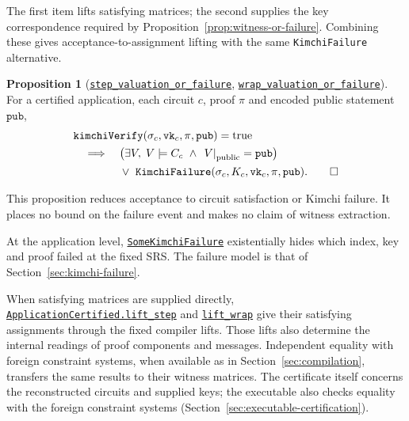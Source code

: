 \documentclass[11pt,a4paper]{article}
\newcommand{\inlinecode}[1]{\mbox{\texttt{#1}}}
\newcommand{\restrict}[2]{\left.#1\right\rvert_{#2}}
\theoremstyle{definition}
\theoremstyle{insetstatement}
\newtheorem{propositiontext}[example]{Proposition}
\newenvironment{statementblock}
  {\begin{list}{}{%
    \setlength{\leftmargin}{0pt}%
    \setlength{\rightmargin}{0pt}%
    \setlength{\labelwidth}{0pt}%
    \setlength{\labelsep}{0pt}%
    \setlength{\itemindent}{0pt}%
    \setlength{\listparindent}{0pt}%
    \setlength{\topsep}{.7\baselineskip plus 2pt minus 1pt}%
    \setlength{\partopsep}{0pt}%
    \setlength{\parsep}{0pt}%
    \setlength{\itemsep}{0pt}}%
    \item\relax}
  {\end{list}}
\newenvironment{proposition}[1][]
  {\begin{statementblock}\begin{propositiontext}[{#1}]\pushQED{\qed}}
  {\popQED\end{propositiontext}\end{statementblock}}
\begin{document}
The first item lifts satisfying matrices; the second supplies the key
correspondence required by Proposition~\ref{prop:witness-or-failure}.
Combining these gives acceptance-to-assignment lifting with the same
\inlinecode{KimchiFailure} alternative.

\begin{proposition}[\href{https://github.com/l-adic/snarky/blob/main/formal/pickles/Pickles/Application/ProofCorrectness.lean\#L35}{\inlinecode{step\_valuation\_or\_failure}}, \href{https://github.com/l-adic/snarky/blob/main/formal/pickles/Pickles/Application/ProofCorrectness.lean\#L56}{\inlinecode{wrap\_valuation\_or\_failure}}]
\label{prop:acceptance-lifting}
For a certified application, each circuit $c$, proof $\pi$ and encoded
public statement $\mathtt{pub}$,
\[
  \begin{aligned}
    &\mathtt{kimchiVerify}(\sigma_c,\mathtt{vk}_c,\pi,\mathtt{pub})
      =\mathrm{true}\\
    &\quad\Longrightarrow\quad
      \begin{aligned}[t]
        &\bigl(\exists V,\;V\models C_c\ \land\
          \restrict{V}{\mathrm{public}}=\mathtt{pub}\bigr)\\
        &{}\lor\
          \mathtt{KimchiFailure}(\sigma_c,K_c,\mathtt{vk}_c,\pi,\mathtt{pub}).\qedhere
      \end{aligned}
  \end{aligned}
\]
\end{proposition}

This proposition reduces acceptance to circuit satisfaction or Kimchi
failure. It places no bound on the failure event and makes no claim of
witness extraction.

At the application level,
\href{https://github.com/l-adic/snarky/blob/main/formal/pickles/Pickles/Application/ProofCorrectness.lean\#L26}{\inlinecode{SomeKimchiFailure}}
existentially hides which index, key and proof failed at the fixed SRS.
The failure model is that of Section~\ref{sec:kimchi-failure}.

When satisfying matrices are supplied directly, \href{https://github.com/l-adic/snarky/blob/main/formal/pickles/Pickles/Application/MatrixRun.lean\#L115}{\inlinecode{ApplicationCertified.lift\_step}} and \href{https://github.com/l-adic/snarky/blob/main/formal/pickles/Pickles/Application/MatrixRun.lean\#L135}{\inlinecode{lift\_wrap}}
give their satisfying assignments through the fixed compiler lifts.
Those lifts also determine the internal readings of proof components and
messages. Independent equality with foreign constraint systems, when
available as in Section~\ref{sec:compilation}, transfers the same results
to their witness matrices. The certificate itself concerns the reconstructed
circuits and supplied keys; the executable also checks equality with the
foreign constraint systems (Section~\ref{sec:executable-certification}).
\end{document}
